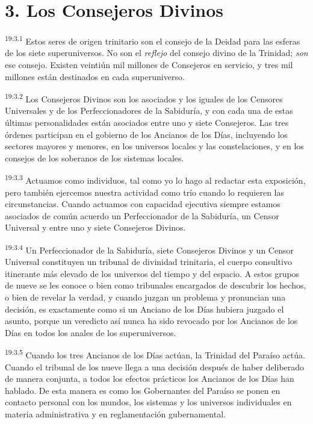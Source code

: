 \section*{3. Los Consejeros Divinos}
\par
\textsuperscript{19:3.1} Estos seres de origen trinitario son el consejo de la Deidad para las esferas de los siete superuniversos. No son el \textit{reflejo} del consejo divino de la Trinidad; \textit{son} ese consejo. Existen veintiún mil millones de Consejeros en servicio, y tres mil millones están destinados en cada superuniverso.

\par
\textsuperscript{19:3.2} Los Consejeros Divinos son los asociados y los iguales de los Censores Universales y de los Perfeccionadores de la Sabiduría, y con cada una de estas últimas personalidades están asociados entre uno y siete Consejeros. Las tres órdenes participan en el gobierno de los Ancianos de los Días, incluyendo los sectores mayores y menores, en los universos locales y las constelaciones, y en los consejos de los soberanos de los sistemas locales.

\par
\textsuperscript{19:3.3} Actuamos como individuos, tal como yo lo hago al redactar esta exposición, pero también ejercemos nuestra actividad como trío cuando lo requieren las circunstancias. Cuando actuamos con capacidad ejecutiva siempre estamos asociados de común acuerdo un Perfeccionador de la Sabiduría, un Censor Universal y entre uno y siete Consejeros Divinos.

\par
\textsuperscript{19:3.4} Un Perfeccionador de la Sabiduría, siete Consejeros Divinos y un Censor Universal constituyen un tribunal de divinidad trinitaria, el cuerpo consultivo itinerante más elevado de los universos del tiempo y del espacio. A estos grupos de nueve se les conoce o bien como tribunales encargados de descubrir los hechos, o bien de revelar la verdad, y cuando juzgan un problema y pronuncian una decisión, es exactamente como si un Anciano de los Días hubiera juzgado el asunto, porque un veredicto así nunca ha sido revocado por los Ancianos de los Días en todos los anales de los superuniversos.

\par
\textsuperscript{19:3.5} Cuando los tres Ancianos de los Días actúan, la Trinidad del Paraíso actúa. Cuando el tribunal de los nueve llega a una decisión después de haber deliberado de manera conjunta, a todos los efectos prácticos los Ancianos de los Días han hablado. De esta manera es como los Gobernantes del Paraíso se ponen en contacto personal con los mundos, los sistemas y los universos individuales en materia administrativa y en reglamentación gubernamental.

